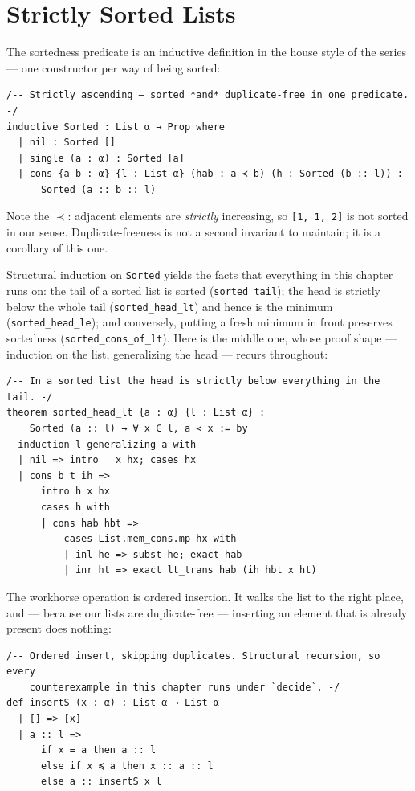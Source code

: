 \documentclass[12pt, a4paper, openright]{book}
\theoremstyle{thmstyle}
\theoremstyle{defstyle}
\newcommand{\lc}[1]{\texttt{#1}}
\begin{document}
\section{Strictly Sorted Lists}

The sortedness predicate is an inductive definition in the house style
of the series --- one constructor per way of being sorted:

\begin{verbatim}
/-- Strictly ascending — sorted *and* duplicate-free in one predicate. -/
inductive Sorted : List α → Prop where
  | nil : Sorted []
  | single (a : α) : Sorted [a]
  | cons {a b : α} {l : List α} (hab : a ≺ b) (h : Sorted (b :: l)) :
      Sorted (a :: b :: l)
\end{verbatim}

Note the $\prec$: adjacent elements are \emph{strictly} increasing, so
\lc{[1, 1, 2]} is not sorted in our sense. Duplicate-freeness is not a
second invariant to maintain; it is a corollary of this one.

Structural induction on \lc{Sorted} yields the facts that everything in
this chapter runs on: the tail of a sorted list is sorted
(\lc{sorted_tail}); the head is strictly below the whole tail
(\lc{sorted_head_lt}) and hence is the minimum
(\lc{sorted_head_le}); and conversely, putting a fresh minimum in front
preserves sortedness (\lc{sorted_cons_of_lt}). Here is the middle one,
whose proof shape --- induction on the list, generalizing the head ---
recurs throughout:

\begin{verbatim}
/-- In a sorted list the head is strictly below everything in the tail. -/
theorem sorted_head_lt {a : α} {l : List α} :
    Sorted (a :: l) → ∀ x ∈ l, a ≺ x := by
  induction l generalizing a with
  | nil => intro _ x hx; cases hx
  | cons b t ih =>
      intro h x hx
      cases h with
      | cons hab hbt =>
          cases List.mem_cons.mp hx with
          | inl he => subst he; exact hab
          | inr ht => exact lt_trans hab (ih hbt x ht)
\end{verbatim}

The workhorse operation is ordered insertion. It walks the list to the
right place, and --- because our lists are duplicate-free --- inserting
an element that is already present does nothing:

\begin{verbatim}
/-- Ordered insert, skipping duplicates. Structural recursion, so every
    counterexample in this chapter runs under `decide`. -/
def insertS (x : α) : List α → List α
  | [] => [x]
  | a :: l =>
      if x = a then a :: l
      else if x ≼ a then x :: a :: l
      else a :: insertS x l
\end{verbatim}
\end{document}

